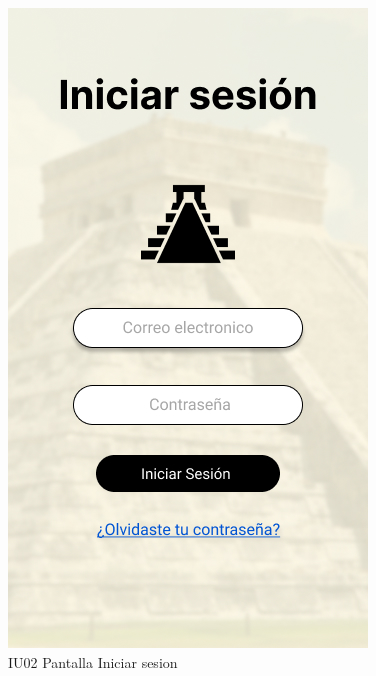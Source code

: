 \begin{figure}[h]
    \begin{minipage}{0.4\textwidth}
        \centering
        \includegraphics[width=.7\linewidth]{Pantallas Prototipo3/IU02 Pantalla Iniciar sesion.jpg}
        \caption{IU02 Pantalla Iniciar sesion}
    \end{minipage}%
\end{figure}

